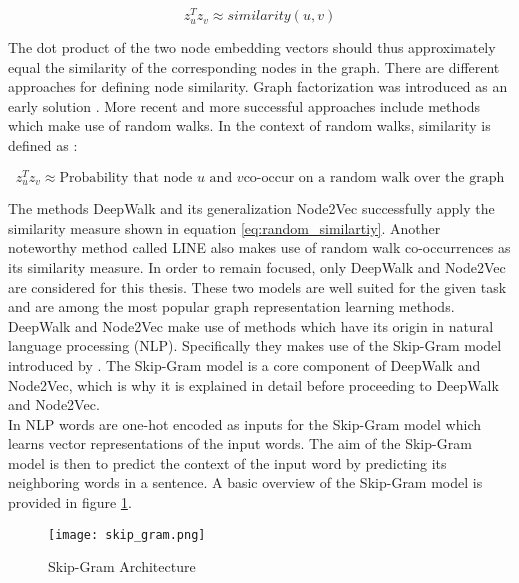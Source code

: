 	\begin{equation}
		z_u^Tz_v \approx similarity(u,v)
	\end{equation}

	\noindent The dot product of the two node embedding vectors should thus
	approximately equal the similarity of the corresponding nodes in the
	graph. There are different approaches for defining node similarity. Graph 
	factorization was introduced as an early solution 
	\citep{ahmed2013distributed}. More recent and more successful approaches 
	include methods which make use of random walks. In the context of random
	walks, similarity is defined as \citep{leskovec2021lecture}:

	\begin{equation}
		z_u^Tz_v \approx \text{Probability that node $u$ and $v$
								co-occur on a random walk over the graph}
	\label{eq:random_similartiy}
	\end{equation}

	\noindent The methods DeepWalk \citep{perozzi2014deepwalk} and its 
	generalization Node2Vec \citep{grover2016node2vec} successfully apply the
	similarity measure shown in equation \ref{eq:random_similartiy}. Another 
	noteworthy method called LINE \citep{tang2015line} also makes use of random
	walk co-occurrences as its similarity measure. In order to remain focused,
	only DeepWalk and Node2Vec are considered for this thesis. These two models
	are well suited for the given task and are among the most popular graph
	representation learning methods. \\

	\noindent DeepWalk and Node2Vec make use of methods which have its origin in 
	natural language processing (NLP). Specifically they makes use of the 
	Skip-Gram model introduced by \cite{mikolov2013efficient,mikolov2013distributed}. 
	The Skip-Gram model is a core component of DeepWalk and Node2Vec, which is why 
	it is explained in detail before proceeding to DeepWalk and Node2Vec. \\

	\noindent In NLP words are one-hot encoded as inputs for the Skip-Gram model 
	which learns vector representations of the input words. The aim of the
	Skip-Gram model is then to predict the context of the input word by
	predicting its neighboring words in a sentence. A basic overview of the 
	Skip-Gram model is provided in figure \ref{fig:skip_gram}. 

	\begin{figure}
		\centering
		\texttt{[image: skip\_gram.png]}
		\caption{Skip-Gram Architecture}
		\cite[p. 5]{mikolov2013efficient}
		\label{fig:skip_gram}
	\end{figure}

